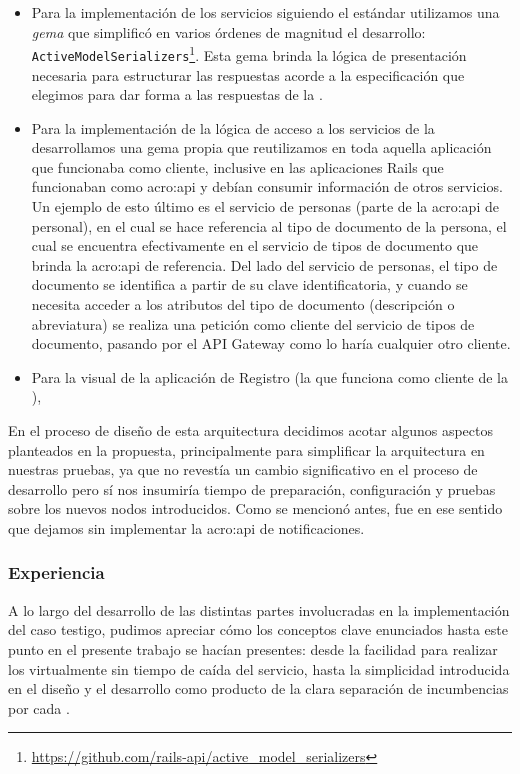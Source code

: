 \begin{itemize}
  \item Para la implementación de los servicios siguiendo el estándar  utilizamos una \textit{gema} que simplificó en varios órdenes de magnitud el desarrollo: \texttt{ActiveModelSerializers}\footnote{\url{https://github.com/rails-api/active_model_serializers}}. Esta gema brinda la lógica de presentación necesaria para estructurar las respuestas acorde a la especificación  que elegimos para dar forma a las respuestas de la {\cloud}.

  \item Para la implementación de la lógica de acceso a los servicios de la {\cloud} desarrollamos una gema propia que reutilizamos en toda aquella aplicación que funcionaba como cliente, inclusive en las aplicaciones Rails que funcionaban como \gls{acro:api} y debían consumir información de otros servicios. Un ejemplo de esto último es el servicio de personas (parte de la \gls{acro:api} de personal), en el cual se hace referencia al tipo de documento de la persona, el cual se encuentra efectivamente en el servicio de tipos de documento que brinda la \gls{acro:api} de referencia. Del lado del servicio de personas, el tipo de documento se identifica a partir de su clave identificatoria, y cuando se necesita acceder a los atributos del tipo de documento (descripción o abreviatura) se realiza una petición como cliente del servicio de tipos de documento, pasando por el API Gateway como lo haría cualquier otro cliente.

  \item Para la visual de la aplicación de Registro (la que funciona como cliente de la {\cloud}),
\end{itemize}

En el proceso de diseño de esta arquitectura decidimos acotar algunos aspectos planteados en la propuesta, principalmente para simplificar la arquitectura en nuestras pruebas, ya que no revestía un cambio significativo en el proceso de desarrollo pero sí nos insumiría tiempo de preparación, configuración y pruebas sobre los nuevos nodos introducidos. Como se mencionó antes, fue en ese sentido que dejamos sin implementar la \gls{acro:api} de notificaciones.

\subsubsection{Experiencia}

A lo largo del desarrollo de las distintas partes involucradas en la implementación del caso testigo, pudimos apreciar cómo los conceptos clave enunciados hasta este punto en el presente trabajo se hacían presentes: desde la facilidad para realizar los  virtualmente sin tiempo de caída del servicio, hasta la simplicidad introducida en el diseño y el desarrollo como producto de la clara separación de incumbencias por cada .

